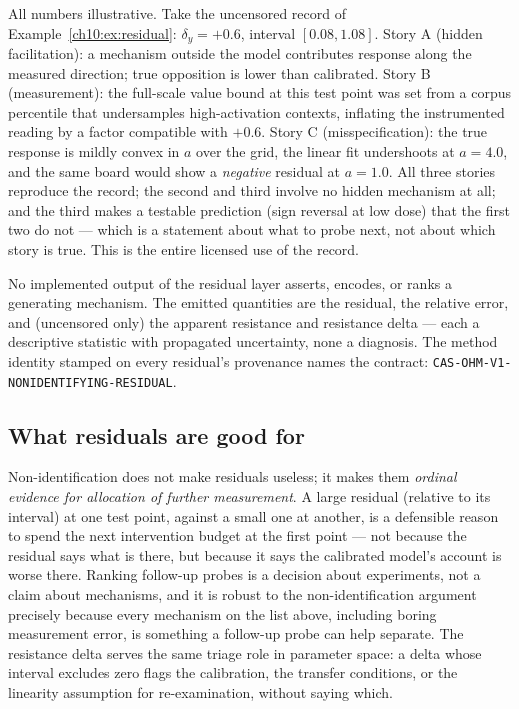 \begin{example}\label{ch10:ex:stories}
All numbers illustrative. Take the uncensored record of
Example~\ref{ch10:ex:residual}: $\delta_y = +0.6$, interval
$[0.08, 1.08]$. Story A (hidden facilitation): a mechanism outside the
model contributes response along the measured direction; true
opposition is lower than calibrated. Story B (measurement): the
full-scale value bound at this test point was set from a corpus
percentile that undersamples high-activation contexts, inflating the
instrumented reading by a factor compatible with $+0.6$. Story C
(misspecification): the true response is mildly convex in $a$ over the
grid, the linear fit undershoots at $a = 4.0$, and the same board would
show a \emph{negative} residual at $a = 1.0$. All three stories
reproduce the record; the second and third involve no hidden mechanism
at all; and the third makes a testable prediction (sign reversal at low
dose) that the first two do not --- which is a statement about what to
probe next, not about which story is true. This is the entire licensed
use of the record.
\end{example}

\begin{ruleenv}\label{ch10:rule:nonident}
No implemented output of the residual layer asserts, encodes, or ranks a
generating mechanism. The emitted quantities are the residual, the
relative error, and (uncensored only) the apparent resistance and
resistance delta --- each a descriptive statistic with propagated
uncertainty, none a diagnosis. The method identity stamped on every
residual's provenance names the contract:
\texttt{CAS-OHM-V1-NONIDENTIFYING-RESIDUAL}.
\end{ruleenv}

\subsection{What residuals are good for}\label{ch10:sec:goodfor}

Non-identification does not make residuals useless; it makes them
\emph{ordinal evidence for allocation of further measurement}. A large
residual (relative to its interval) at one test point, against a small
one at another, is a defensible reason to spend the next intervention
budget at the first point --- not because the residual says what is
there, but because it says the calibrated model's account is worse
there. Ranking follow-up probes is a decision about experiments, not a
claim about mechanisms, and it is robust to the non-identification
argument precisely because every mechanism on the list above, including
boring measurement error, is something a follow-up probe can help
separate. The resistance delta serves the same triage role in parameter
space: a delta whose interval excludes zero flags the calibration, the
transfer conditions, or the linearity assumption for re-examination,
without saying which.

